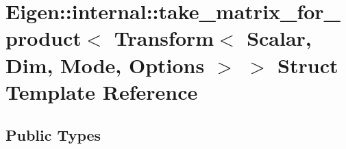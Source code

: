 \hypertarget{struct_eigen_1_1internal_1_1take__matrix__for__product_3_01_transform_3_01_scalar_00_01_dim_00_01_mode_00_01_options_01_4_01_4}{}\section{Eigen\+:\+:internal\+:\+:take\+\_\+matrix\+\_\+for\+\_\+product$<$ Transform$<$ Scalar, Dim, Mode, Options $>$ $>$ Struct Template Reference}
\label{struct_eigen_1_1internal_1_1take__matrix__for__product_3_01_transform_3_01_scalar_00_01_dim_00_01_mode_00_01_options_01_4_01_4}
\subsection*{Public Types}
